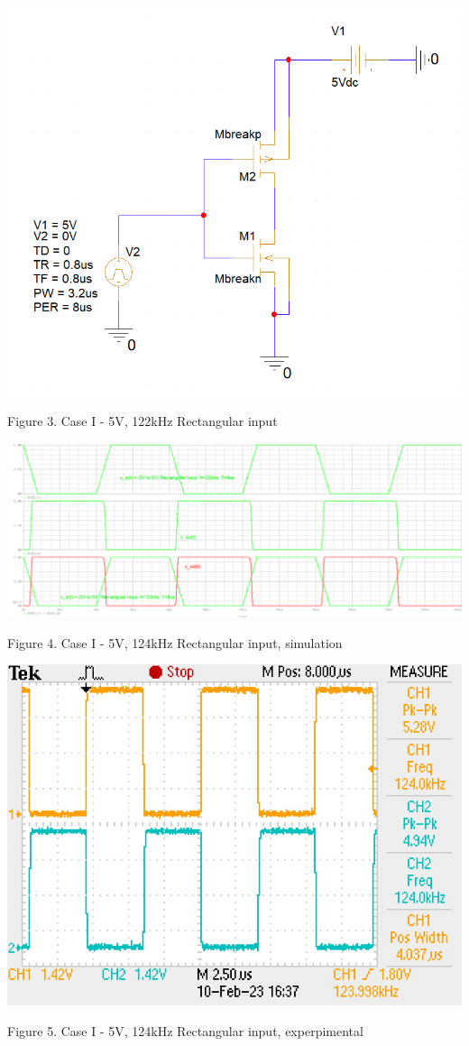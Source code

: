 \documentclass[conference]{IEEEtran}
\begin{document}
\begin{center}
    \centerline{\includegraphics[scale = 0.43]{figures/case1_circuit.png}}
    Figure 3. Case I - 5V, 122kHz Rectangular input
\end{center}

\begin{center}
    \centerline{\includegraphics[scale = 0.18]{figures/case1_results1.png}}
    Figure 4. Case I - 5V, 124kHz Rectangular input, simulation
\end{center}

\begin{center}
    \centerline{\includegraphics[scale = 0.9]{figures/case1_lab_result.JPG}}
    Figure 5. Case I - 5V, 124kHz Rectangular input, experpimental
\end{center}
\end{document}
